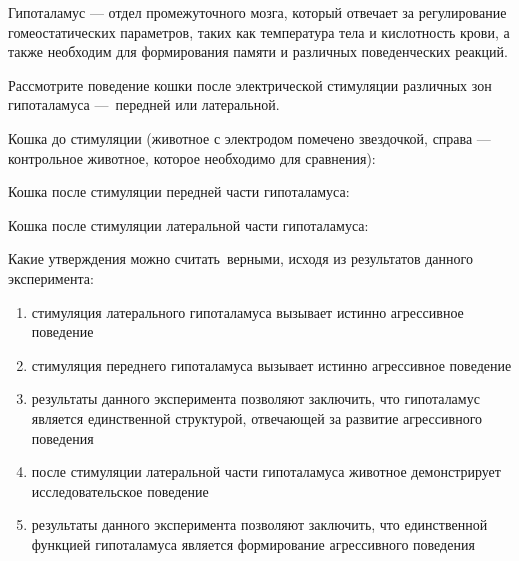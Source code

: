 
Гипоталамус — отдел промежуточного мозга, который отвечает за регулирование гомеостатических параметров, таких как температура тела и кислотность крови, а также необходим для формирования памяти и различных поведенческих реакций.

Рассмотрите поведение кошки после электрической стимуляции различных зон гипоталамуса — передней или латеральной.

Кошка до стимуляции (животное с электродом помечено звездочкой, справа — контрольное животное, которое необходимо для сравнения):


Кошка после стимуляции передней части гипоталамуса:


Кошка после стимуляции латеральной части гипоталамуса:


Какие утверждения можно считать верными, исходя из результатов данного эксперимента:

\begin{enumerate}
    \item стимуляция латерального гипоталамуса вызывает истинно агрессивное поведение
    \item стимуляция переднего гипоталамуса вызывает истинно агрессивное поведение
    \item результаты данного эксперимента позволяют заключить, что гипоталамус является единственной структурой, отвечающей за развитие агрессивного поведения
    \item после стимуляции латеральной части гипоталамуса животное демонстрирует исследовательское поведение
    \item результаты данного эксперимента позволяют заключить, что единственной функцией гипоталамуса является формирование агрессивного поведения
\end{enumerate}